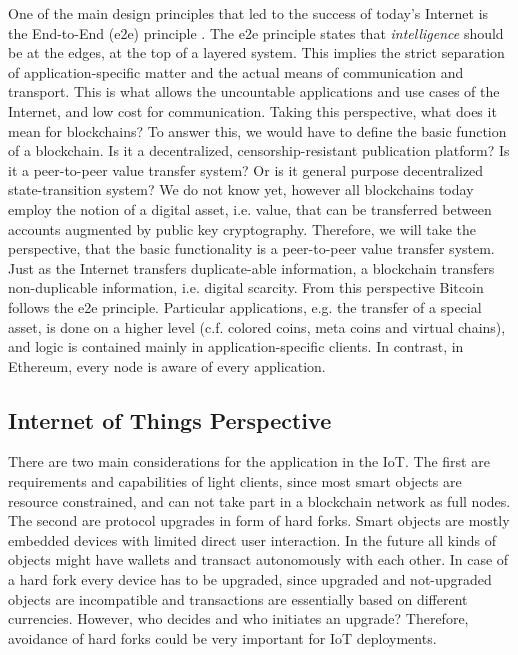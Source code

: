 One of the main design principles that led to the success of today's Internet is the End-to-End (e2e) principle \parencite{Saltzer:1984:EAS:357401.357402}. The e2e principle states that \emph{intelligence} should be at the edges, at the top of a layered system. This implies the strict separation of application-specific matter and the actual means of communication and transport. This is what allows the uncountable applications and use cases of the Internet, and low cost for communication. Taking this perspective, what does it mean for blockchains? To answer this, we would have to define the basic function of a blockchain. Is it a decentralized, censorship-resistant publication platform? Is it a peer-to-peer value transfer system? Or is it general purpose decentralized state-transition system? We do not know yet, however all blockchains today employ the notion of a digital asset, i.e. value, that can be transferred between accounts augmented by public key cryptography. Therefore, we will take the perspective, that the basic functionality is a peer-to-peer value transfer system. Just as the Internet transfers duplicate-able information, a blockchain transfers non-duplicable information, i.e. digital scarcity. From this perspective Bitcoin follows the e2e principle. Particular applications, e.g. the transfer of a special asset, is done on a higher level (c.f. colored coins, meta coins and virtual chains), and logic is contained mainly in application-specific clients. In contrast, in Ethereum, every node is aware of every application.



\subsection{Internet of Things Perspective}

There are two main considerations for the application in the IoT. The first are requirements and capabilities of light clients, since most smart objects are resource constrained, and can not take part in a blockchain network as full nodes. The second are protocol upgrades in form of hard forks. Smart objects are mostly embedded devices with limited direct user interaction. In the future all kinds of objects might have wallets and transact autonomously with each other. In case of a hard fork every device has to be upgraded, since upgraded and not-upgraded objects are incompatible and transactions are essentially based on different currencies. However, who decides and who initiates an upgrade? Therefore, avoidance of hard forks could be very important for IoT deployments.



